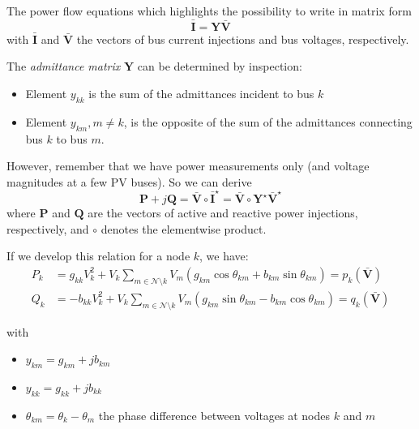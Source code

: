 \begin{frame}[allowframebreaks]{The power flow equations}
    which highlights the possibility to write in matrix form
    \begin{equation}
        \mathbf{\bar{I}} = \mathbf{Y} \mathbf{\bar{V}} \label{eq:bus_inj_mat}
    \end{equation}
    with $\mathbf{\bar{I}}$ and $\mathbf{\bar{V}}$ the vectors of bus current injections and bus voltages, respectively.
    
    \newpage
    The \textit{admittance matrix} $\mathbf{Y}$ can be determined by inspection:
    \begin{itemize}
        \item Element $y_{kk}$ is the sum of the admittances incident to bus $k$
        \item Element $y_{km}, m \neq k$, is the opposite of the sum of the admittances connecting bus $k$ to bus $m$.
    \end{itemize}

    However, remember that we have power measurements only (and voltage magnitudes at a few PV buses). So we can derive
    \begin{equation}
        \mathbf{P} +j \mathbf{Q} = \mathbf{\bar{V}} \circ \mathbf{\bar{I}}^{\star}
        = \mathbf{\bar{V}} \circ \mathbf{Y}^{\star} \mathbf{\bar{V}}^{\star} \label{eq:pf}
    \end{equation}
    where $\mathbf{P}$ and $\mathbf{Q}$ are the vectors of active and reactive power injections, respectively, and $\circ$ denotes the elementwise product.
    
    If we develop this relation for a node $k$, we have:
    \begin{align}
        P_k &= g_{kk} V_k^2  + V_k \sum_{m \in \mathcal{N} \setminus k} V_m(g_{km} \cos\theta_{km} + b_{km} \sin\theta_{km}) = p_k(\mathbf{\bar{V}}) \label{eq:pf_P}\\
        Q_k &= -b_{kk} V_k^2 + V_k \sum_{m \in \mathcal{N} \setminus k} V_m(g_{km} \sin\theta_{km} - b_{km} \cos\theta_{km}) = q_k(\mathbf{\bar{V}}) \label{eq:pf_Q}
    \end{align}
   
    with
    \begin{itemize}
        \item $y_{km} = g_{km} + j b_{km}$
        \item $y_{kk} = g_{kk} + j b_{kk}$ 
        \item $\theta_{km} = \theta_{k} - \theta_{m}$ the phase difference between voltages at nodes $k$ and $m$
    \end{itemize}
\end{frame}

